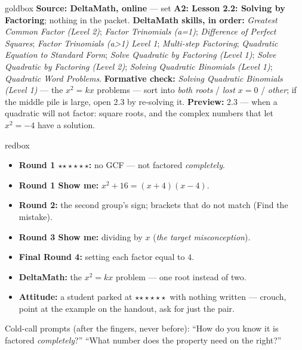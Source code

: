 \documentclass[10pt]{article}
\newcommand{\rung}[1]{{\color{goldacc}\ifcase#1\or$\star$\or$\star\star$\or$\star\star\star$\fi}}
\begin{document}
\boxguard
\begin{skillbox}{goldbox}
\textbf{Source: DeltaMath, online} --- set \textbf{A2: Lesson 2.2: Solving by Factoring}; nothing in the
packet. \textbf{DeltaMath skills, in order:} \emph{Greatest Common Factor (Level 2)}; \emph{Factor
Trinomials (a=1)}; \emph{Difference of Perfect Squares}; \emph{Factor Trinomials (a>1) Level 1};
\emph{Multi-step Factoring}; \emph{Quadratic Equation to Standard Form}; \emph{Solve Quadratic by
Factoring (Level 1)}; \emph{Solve Quadratic by Factoring (Level 2)}; \emph{Solving Quadratic
Binomials (Level 1)}; \emph{Quadratic Word Problems}.
\textbf{Formative check:} \emph{Solving Quadratic Binomials (Level 1)} --- the $x^2=kx$ problems --- sort into \emph{both roots} / \emph{lost
$x=0$} / \emph{other}; if the middle pile is large, open 2.3 by re-solving it.
\textbf{Preview:} 2.3 --- when a quadratic will not factor: square roots, and the complex
numbers that let $x^2=-4$ have a solution.
\end{skillbox}

\boxguard
\begin{skillbox}{redbox}
\begin{itemize}[leftmargin=1.2em, nosep]
  \item \textbf{Round 1 \rung3:} no GCF --- not factored \emph{completely}.
  \item \textbf{Round 1 Show me:} $x^2+16=(x+4)(x-4)$.
  \item \textbf{Round 2:} the second group's sign; brackets that do not match (Find the mistake).
  \item \textbf{Round 3 Show me:} dividing by $x$ (\emph{the target misconception}).
  \item \textbf{Final Round 4:} setting each factor equal to $4$.
  \item \textbf{DeltaMath:} the $x^2=kx$ problem --- one root instead of two.
  \item \textbf{Attitude:} a student parked at \rung1\ with nothing written --- crouch, point at
        the example on the handout, ask for just the pair.
\end{itemize}
Cold-call prompts (after the fingers, never before): ``How do you know it is factored
\emph{completely}?'' \; ``What number does the property need on the right?''
\end{skillbox}
\end{document}
